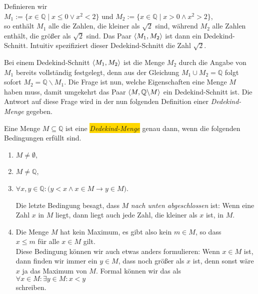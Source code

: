 \example 
Definieren wir
\\[0.2cm]
\hspace*{1.3cm} 
$M_1 := \{ x \in \mathbb{Q} \mid x \leq 0 \vee x^2 < 2 \}$ \quad und \quad
$M_2 := \{ x \in \mathbb{Q} \mid x > 0 \wedge x^2 > 2 \}$,
\\[0.2cm]
so enth\"alt $M_1$ alle die Zahlen, die kleiner als $\sqrt{2}$ sind, w\"ahrend
$M_2$ alle Zahlen enth\"alt, die gr\"o\ss{}er als $\sqrt{2}$ sind. Das Paar $\pair(M_1,M_2)$ ist dann ein
Dedekind-Schnitt.  Intuitiv spezifiziert dieser Dedekind-Schnitt die Zahl $\sqrt{2}$.
\eox



Bei einem Dedekind-Schnitt $\pair(M_1,M_2)$ ist die Menge $M_2$ durch die Angabe von
$M_1$ bereits vollst\"andig festgelegt, denn aus der Gleichung $M_1 \cup M_2 = \mathbb{Q}$ folgt
sofort $M_2 = \mathbb{Q} \backslash M_1$.  Die Frage ist nun, welche Eigenschaften eine Menge $M$
haben muss, damit umgekehrt das Paar $\pair(M, \mathbb{Q} \backslash M)$ ein Dedekind-Schnitt ist.
Die Antwort auf diese Frage wird in der nun folgenden Definition einer \emph{Dedekind-Menge} gegeben.


\begin{Definition}
Eine Menge $M \subseteq \mathbb{Q}$ ist eine \colorbox{gold}{\emph{Dedekind-Menge}} genau dann, wenn die
folgenden Bedingungen erf\"ullt sind.
\begin{enumerate}
\item $M \not= \emptyset$,
\item $M \not= \mathbb{Q}$,
\item $\forall x, y \in \mathbb{Q}: \bigl(y < x \wedge x \in M \rightarrow y \in M)$.

      Die letzte Bedingung besagt, dass $M$ \emph{nach unten abgeschlossen} ist:  Wenn eine
      Zahl $x$ in $M$ liegt, dann liegt auch jede Zahl, die kleiner als $x$ ist, in $M$.
\item Die Menge $M$ hat kein Maximum, es gibt also kein $m \in M$, so dass
      \\[0.2cm]
      \hspace*{1.3cm}
      $x \leq m$ \quad f\"ur alle $x \in M$ gilt.
      \\[0.2cm]
      Diese Bedingung k\"onnen wir auch etwas anders formulieren:  Wenn $x \in M$ ist, dann finden wir
      immer ein $y \in M$, dass noch gr\"o\ss{}er als $x$ ist, denn sonst w\"are $x$ ja das Maximum von $M$.
      Formal k\"onnen wir das als
      \\[0.2cm]
      \hspace*{1.3cm}
      $\forall x \in M: \exists y \in M: x < y$
      \\[0.2cm]
      schreiben.
\end{enumerate}
\end{Definition}

